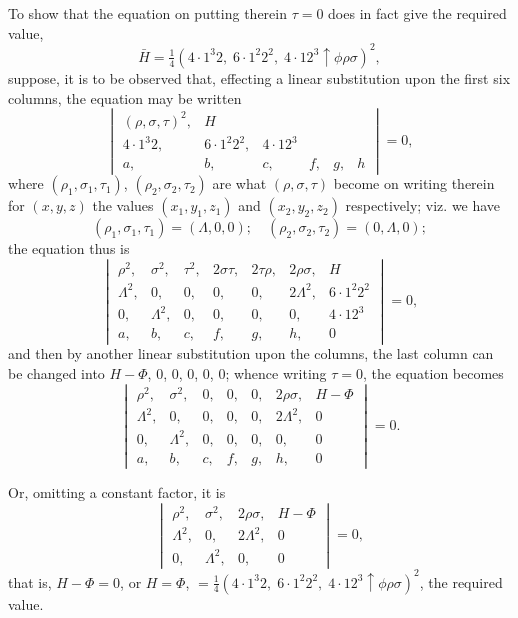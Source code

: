 \documentclass[11pt,a4paper]{book}
\begin{document}
\begin{art}\label{art:45}
To show that the equation on putting therein $\tau = 0$ does in fact give the required value,
\[
\bar{H} = \tfrac{1}{4}(4 \cdot 1^3 2,\; 6 \cdot 1^2 2^2,\; 4 \cdot 12^3 \uparrow\phi\rho\sigma)^2,
\]
suppose, it is to be observed that, effecting a linear substitution upon the first six columns, the equation may be written
\[
\begin{vmatrix}
(\rho, \sigma, \tau)^2, & H \\
4 \cdot 1^3 2, & 6 \cdot 1^2 2^2, & 4 \cdot 12^3 \\
a, & b, & c, & f, & g, & h
\end{vmatrix} = 0,
\]
where $(\rho_1, \sigma_1, \tau_1)$, $(\rho_2, \sigma_2, \tau_2)$ are what $(\rho, \sigma, \tau)$ become on writing therein for $(x, y, z)$ the values $(x_1, y_1, z_1)$ and $(x_2, y_2, z_2)$ respectively; viz. we have
\[
(\rho_1, \sigma_1, \tau_1) = (\Lambda, 0, 0);\quad (\rho_2, \sigma_2, \tau_2) = (0, \Lambda, 0);
\]
the equation thus is
\[
\begin{vmatrix}
\rho^2, & \sigma^2, & \tau^2, & 2\sigma\tau, & 2\tau\rho, & 2\rho\sigma, & H \\
\Lambda^2, & 0, & 0, & 0, & 0, & 2\Lambda^2, & 6 \cdot 1^2 2^2 \\
0, & \Lambda^2, & 0, & 0, & 0, & 0, & 4 \cdot 12^3 \\
a, & b, & c, & f, & g, & h, & 0
\end{vmatrix} = 0,
\]
and then by another linear substitution upon the columns, the last column can be changed into $H - \Phi$, $0$, $0$, $0$, $0$, $0$; whence writing $\tau = 0$, the equation becomes
\[
\begin{vmatrix}
\rho^2, & \sigma^2, & 0, & 0, & 0, & 2\rho\sigma, & H - \Phi \\
\Lambda^2, & 0, & 0, & 0, & 0, & 2\Lambda^2, & 0 \\
0, & \Lambda^2, & 0, & 0, & 0, & 0, & 0 \\
a, & b, & c, & f, & g, & h, & 0
\end{vmatrix} = 0.
\]
\end{art}

\newpage
Or, omitting a constant factor, it is
\[
\begin{vmatrix}
\rho^2, & \sigma^2, & 2\rho\sigma, & H - \Phi \\
\Lambda^2, & 0, & 2\Lambda^2, & 0 \\
0, & \Lambda^2, & 0, & 0
\end{vmatrix} = 0,
\]
that is, $H - \Phi = 0$, or $H = \Phi$, $= \frac{1}{4}(4 \cdot 1^3 2,\; 6 \cdot 1^2 2^2,\; 4 \cdot 12^3 \uparrow\phi\rho\sigma)^2$, the required value.
\end{document}
